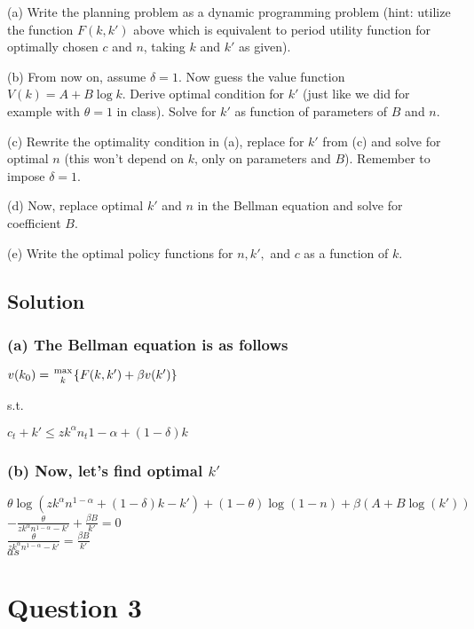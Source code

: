 \documentclass[10pt, a4paper]{article}
\begin{document}
    (a) Write the planning problem as a dynamic programming problem (hint: utilize the function $F(k,k')$ above which is equivalent to period utility function for optimally chosen $c$ and $n$, taking $k$ and $k'$ as given).

    (b) From now on, assume $\delta=1$. Now guess the value function $V(k)=A+B\log k$. Derive optimal condition for $k'$ (just like we did for example with $\theta=1$ in class). Solve for $k'$ as function of parameters of $B$ and $n$.

    (c) Rewrite the optimality condition in (a), replace for $k'$ from (c) and solve for optimal $n$ (this won't depend on $k$, only on parameters and $B$). Remember to impose $\delta=1$.

    (d) Now, replace optimal $k'$ and $n$ in the Bellman equation and solve for coefficient $B$.

    (e) Write the optimal policy functions for $n,k',$ and $c$ as a function of $k$.
  \subsection*{Solution}
    \subsubsection*{(a) The Bellman equation is as follows}
    \begin{center}
      $v(k_0) = {\max\atop{k}}\{F(k,k')+\beta v(k')\}$
    \end{center}
    s.t.
    \begin{center}
      $c_t+k'\leq zk^{\alpha}n_t{1-\alpha}+(1-\delta)k$
    \end{center}
    \subsubsection*{(b) Now, let's find optimal $k'$}
    \begin{center}
      $\theta\log(zk^{\alpha}n^{1-\alpha}+(1-\delta)k-k')+(1-\theta)\log(1-n)+\beta(A+B\log(k'))$ \\
      $-\frac{\theta}{zk^{\alpha}n^{1-\alpha}-k'}+\frac{\beta B}{k'}=0$ \\
      $\frac{\theta}{zk^{\alpha}n^{1-\alpha}-k'}=\frac{\beta B}{k'}$ \\
      $as$
    \end{center}
\section*{Question 3}
\end{document}
